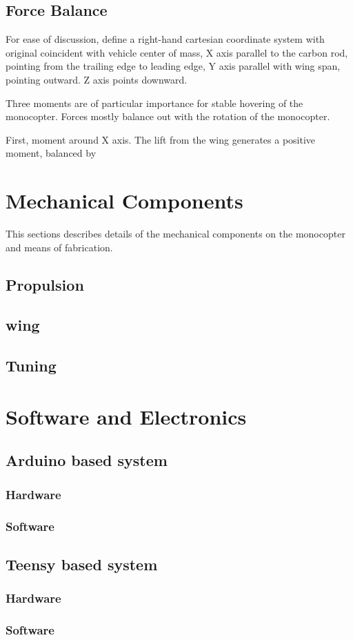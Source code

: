 \documentclass[12pt]{article}
\begin{document}
\subsection{Force Balance}
For ease of discussion, define a right-hand cartesian coordinate system with original coincident with vehicle center of mass, X axis parallel to the carbon rod, pointing from the trailing edge to leading edge, Y axis parallel with wing span, pointing outward. Z axis points downward.

Three moments are of particular importance for stable hovering of the monocopter. Forces mostly balance out with the rotation of the monocopter.

First, moment around X axis. The lift from the wing generates a positive moment, balanced by 

\section{Mechanical Components}
This sections describes details of the mechanical components on the monocopter and means of fabrication.
\subsection{Propulsion}


\subsection{wing}
\subsection{Tuning}

\section{Software and Electronics}
\subsection{Arduino based system}
\subsubsection{Hardware}
\subsubsection{Software}

\subsection{Teensy based system}
\subsubsection{Hardware}
\subsubsection{Software}
\end{document}
